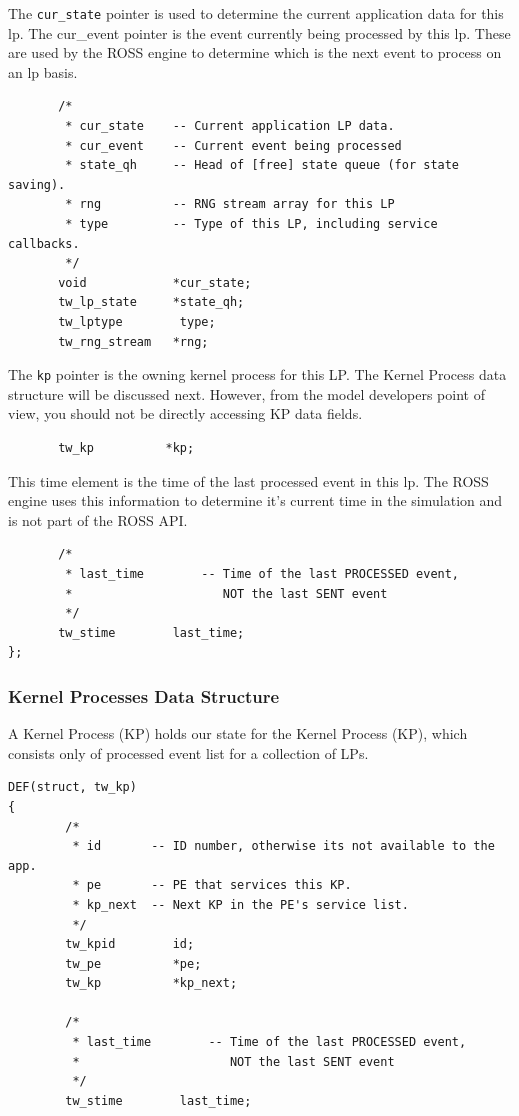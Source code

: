 \documentclass[12pt]{article}
\begin{document}
The {\tt cur\_state} pointer is used to determine the current application
data for this lp.  The cur\_event pointer is the event currently being
processed by this lp.  These are used by the ROSS engine to determine
which is the next event to process on an lp basis.

\begin{verbatim}
       /*
        * cur_state    -- Current application LP data.
        * cur_event    -- Current event being processed
        * state_qh     -- Head of [free] state queue (for state saving).
        * rng          -- RNG stream array for this LP
        * type         -- Type of this LP, including service callbacks.
        */
       void            *cur_state;
       tw_lp_state     *state_qh;
       tw_lptype        type;
       tw_rng_stream   *rng;
\end{verbatim}

The {\tt kp} pointer is the owning kernel process for this LP. The
Kernel Process data structure will be discussed next. However, from
the model developers point of view, you should not be directly
accessing KP data fields. 
 
\begin{verbatim}
       tw_kp          *kp;
\end{verbatim}

This time element is the time of the last processed event in this lp.
The ROSS engine uses this information to determine it's current time
in the simulation and is not part of the ROSS API.

\begin{verbatim}
       /*
        * last_time        -- Time of the last PROCESSED event, 
        *                     NOT the last SENT event
        */
       tw_stime        last_time;
};
\end{verbatim}

\subsubsection{Kernel Processes Data Structure}
A Kernel Process (KP) holds our state for the Kernel Process (KP),
which consists only of processed event list for a collection of LPs.

\begin{verbatim}
DEF(struct, tw_kp)
{
        /*
         * id       -- ID number, otherwise its not available to the app.
         * pe       -- PE that services this KP.
         * kp_next  -- Next KP in the PE's service list.
         */
        tw_kpid        id;
        tw_pe          *pe;
        tw_kp          *kp_next;

        /*
         * last_time        -- Time of the last PROCESSED event, 
         *                     NOT the last SENT event
         */
        tw_stime        last_time;
\end{verbatim}
\end{document}
